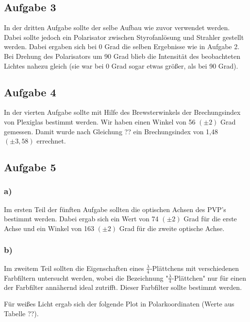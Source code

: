 \documentclass[12pt]{scrartcl}
\begin{document}
\subsection{Aufgabe 3}
In der dritten Aufgabe sollte der selbe Aufbau wie zuvor verwendet werden. Dabei sollte jedoch ein Polarisator zwischen Styrofanlösung und Strahler gestellt werden. Dabei ergaben sich bei 0 Grad die selben Ergebnisse wie in Aufgabe 2. Bei Drehung des Polarisators um 90 Grad blieb die Intensität des beobachteten Lichtes nahezu gleich (sie war bei 0 Grad sogar etwas größer, als bei 90 Grad).


\subsection{Aufgabe 4}
In der vierten Aufgabe sollte mit Hilfe des Brewsterwinkels der Brechungsindex von Plexiglas bestimmt werden. Wir haben einen Winkel von 56 $(\pm 2)$ Grad gemessen. Damit wurde nach Gleichung ?? ein Brechungsindex  von 1,48 $(\pm3,58)$ errechnet.

\subsection{Aufgabe 5}

\subsubsection{a)}
Im ersten Teil der fünften Aufgabe sollten die optischen Achsen des PVP's bestimmt werden.
Dabei ergab sich ein Wert von 74 $(\pm 2)$ Grad für die erste Achse und ein Winkel von 163 $(\pm 2)$ Grad für die zweite optische Achse.

\subsubsection{b)}
Im zweitem Teil sollten die Eigenschaften eines $\frac{\lambda}{4}$-Plättchens mit verschiedenen Farbfiltern untersucht werden, wobei die Bezeichnung "$\frac{\lambda}{4}$-Plättchen" nur für einen der Farbfilter annähernd ideal zutrifft. Dieser Farbfilter sollte bestimmt werden.


Für weißes Licht ergab sich der folgende Plot in Polarkoordinaten (Werte aus Tabelle ??).
\end{document}
